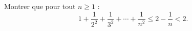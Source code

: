 Montrer que pour tout $n \geq 1$ :
\[
1 + \frac{1}{2^2} + \frac{1}{3^2} + \cdots + \frac{1}{n^2} \leq 2 - \frac{1}{n} < 2.
\]
